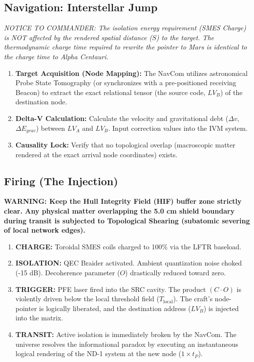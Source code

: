\documentclass[12pt,a4paper]{article}
\begin{document}
\subsection{Navigation: Interstellar Jump}
\textit{NOTICE TO COMMANDER: The isolation energy requirement (SMES Charge) is NOT affected by the rendered spatial distance ($S$) to the target. The thermodynamic charge time required to rewrite the pointer to Mars is identical to the charge time to Alpha Centauri.}
\begin{enumerate}
    \item \textbf{Target Acquisition (Node Mapping):} The NavCom utilizes astronomical Probe State Tomography (or synchronizes with a pre-positioned receiving Beacon) to extract the exact relational tensor (the source code, $LV_B$) of the destination node.
    \item \textbf{Delta-V Calculation:} Calculate the velocity and gravitational debt ($\Delta v$, $\Delta E_{grav}$) between $LV_A$ and $LV_B$. Input correction values into the IVM system.
    \item \textbf{Causality Lock:} Verify that no topological overlap (macroscopic matter rendered at the exact arrival node coordinates) exists.
\end{enumerate}

\subsection{Firing (The Injection)}
\textbf{WARNING: Keep the Hull Integrity Field (HIF) buffer zone strictly clear. Any physical matter overlapping the 5.0 cm shield boundary during transit is subjected to Topological Shearing (subatomic severing of local network edges).}
\begin{enumerate}
    \item \textbf{CHARGE:} Toroidal SMES coils charged to 100\% via the LFTR baseload.
    \item \textbf{ISOLATION:} QEC Braider activated. Ambient quantization noise choked (-15 dB). Decoherence parameter ($O$) drastically reduced toward zero.
    \item \textbf{TRIGGER:} PFE laser fired into the SRC cavity. The product $(C \cdot O)$ is violently driven below the local threshold field ($T_{\mathrm{local}}$). The craft's node-pointer is logically liberated, and the destination address ($LV_B$) is injected into the matrix.
    \item \textbf{TRANSIT:} Active isolation is immediately broken by the NavCom. The universe resolves the informational paradox by executing an instantaneous logical rendering of the ND-1 system at the new node ($1 \times t_P$).
\end{enumerate}
\end{document}
